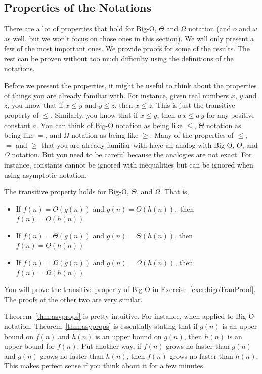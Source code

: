 \subsection{Properties of the Notations}
There are a lot of properties that hold for Big-O, $\Theta$ and $\Omega$ notation
(and $o$ and $\omega$ as well, but we won't focus on those ones in this section).
We will only present a few of the most important ones.  We provide proofs for
some of the results.  
The rest can be proven without too much difficulty using the definitions of the notations.

Before we present the properties, it might be useful to think about the properties of
things you are already familiar with.  
For instance, given real numbers $x$, $y$ and $z$, 
you know that if $x\leq y$ and $y\leq z$, then $x\leq z$.  This is just the
transitive property of $\leq$.  
Similarly, you know that if $x\leq y$, then $a\,x\leq a\,y$ for any positive constant $a$.
You can think of Big-O notation as being like $\leq$, $\Theta$ notation as being like $=$,
and $\Omega$ notation as being like $\geq$.  Many of the properties of $\leq$, $=$ and $\geq$
that you are already familiar with have an analog with Big-O, $\Theta$, and $\Omega$ notation.
But you need to be careful because the analogies are not exact.  For instance, constants cannot
be ignored with inequalities but can be ignored when using asymptotic notation.

\begin{thm}\label{thm:asyprops}
The transitive property holds for Big-O, $\Theta$, and $\Omega$.  That is,
\begin{itemize}
\item If $f(n)=O(g(n))$ and $g(n) =O(h(n)),$ then  $f(n) = O(h(n))$
\item If $f(n)=\Theta(g(n))$ and $g(n) = \Theta(h(n))$, then $f(n) = \Theta(h(n))$
\item If $f(n)=\Omega(g(n))$ and $g(n) = \Omega(h(n))$, then $f(n) = \Omega(h(n))$
\end{itemize}
\begin{pf}
You will prove the transitive property of Big-O in Exercise~\ref{exer:bigoTranProof}.
The proofs of the other two are very similar.
\end{pf}
\end{thm}

Theorem~\ref{thm:asyprops} is pretty intuitive.  
For instance,
when applied to Big-O notation, Theorem~\ref{thm:asyprops} is
essentially stating that if $g(n)$ is an upper bound on $f(n)$ and
$h(n)$ is an upper bound on $g(n)$, then $h(n)$ is an upper bound for $f(n)$.
Put another way, if $f(n)$ grows no faster than $g(n)$ and $g(n)$ grows no faster
than $h(n)$, then $f(n)$ grows no faster than $h(n)$.
This makes perfect sense if you think about it for a few minutes. 

